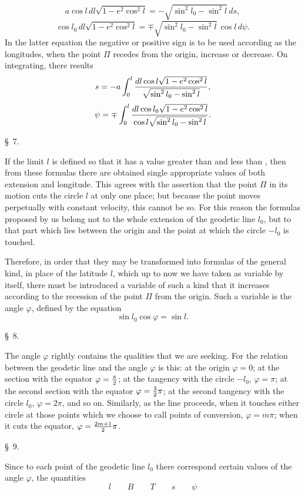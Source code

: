 \[
 a\cos l\,dl\sqrt{1-e^2\cos^2l}=-\sqrt{\sin^2l_0-\sin^2l}\,ds,
\]
\[
 \cos l_0\,dl\sqrt{1-e^2\cos^2l}=\mp\sqrt{\sin^2l_0-\sin^2l}\,\cos l\,d\psi.
\]
In the latter equation the negative or positive sign is to be used according as the longitudes, when the point $\Pi$ recedes from the origin, increase or decrease. On integrating, there results
\[
 s=-a\int_0^l {dl\cos l\sqrt{1-e^2\cos^2l}\over\sqrt{\sin^2l_0-\sin^2l}},
\]
\[
 \psi=\mp\int_0^l {dl\cos l_0\sqrt{1-e^2\cos^2l}\over\cos l\sqrt{\sin^2l_0-\sin^2l}}.
\]

\begin{center}\S\ 7.\end{center}
If the limit $l$ is defined so that it has a value greater than  and less than , then from these formulas there are obtained single appropriate values of both extension and longitude. This agrees with the assertion that the point $\Pi$ in its motion cuts the circle $l$ at only one place; but because the point moves perpetually with constant velocity, this cannot be so. For this reason the formulas proposed by us belong not to the whole extension of the geodetic line $l_0$, but to that part which lies between the origin and the point at which the circle $-l_0$ is touched.

Therefore, in order that they may be transformed into formulas of the general kind, in place of the latitude $l$, which up to now we have taken as variable by itself, there must be introduced a variable of such a kind that it increases according to the recession of the point $\Pi$ from the origin. Such a variable is the angle $\varphi$, defined by the equation
\[
 \sin l_0\cos\varphi=\sin l.
\]

\begin{center}\S\ 8.\end{center}
The angle $\varphi$ rightly contains the qualities that we are seeking. For the relation between the geodetic line and the angle $\varphi$ is this: at the origin $\varphi=0$; at the section with the equator $\varphi={\pi\over2}$; at the tangency with the circle $-l_0$, $\varphi=\pi$; at the second section with the equator $\varphi={3\over2}\pi$; at the second tangency with the circle $l_0$, $\varphi=2\pi$, and so on. Similarly, as the line proceeds, when it touches either circle at those points which we choose to call points of conversion, $\varphi=m\pi$; when it cuts the equator, $\varphi={2m+1\over2}\pi$.

\begin{center}\S\ 9.\end{center}
Since to each point of the geodetic line $l_0$ there correspond certain values of the angle $\varphi$, the quantities
\[
 l\qquad B\qquad T\qquad s\qquad \psi
\]
